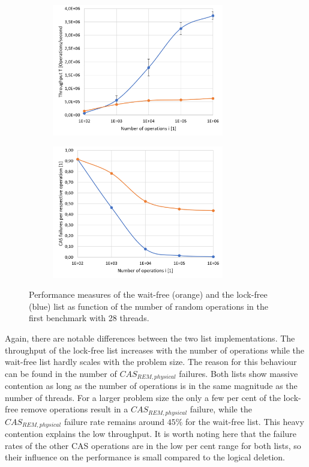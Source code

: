 \documentclass[a4paper, 12pt]{article}
\begin{document}
\begin{figure} [h!]
\begin{subfigure}[c]{0.45\textwidth}
\includegraphics[width=7.5cm]{tp_vs_i.png}
\centering
{}
\end{subfigure}
\begin{subfigure}[c]{0.45\textwidth}
\includegraphics[width=7.5cm]{cas_rem_vs_i.png}
\centering
{}
\end{subfigure}
\caption{Performance measures of the wait-free (orange) and the lock-free (blue) list as function of the number of random operations in the first benchmark with 28 threads.}
\label{performance_i}
\end{figure}

Again, there are notable differences between the two list implementations. The throughput of the lock-free list increases with the number of operations while the wait-free list hardly scales with the problem size. The reason for this behaviour can be found in the number of $CAS_{REM, physical}$ failures. Both lists show massive contention as long as the number of operations is in the same magnitude as the number of threads. For a larger problem size the only a few per cent of the lock-free remove operations result in a $CAS_{REM, physical}$ failure, while the $CAS_{REM, physical}$ failure rate remains around $45\%$ for the wait-free list. This heavy contention explains the low throughput. It is worth noting here that the failure rates of the other CAS operations are in the low per cent range for both lists, so their influence on the performance is small compared to the logical deletion.
\end{document}
